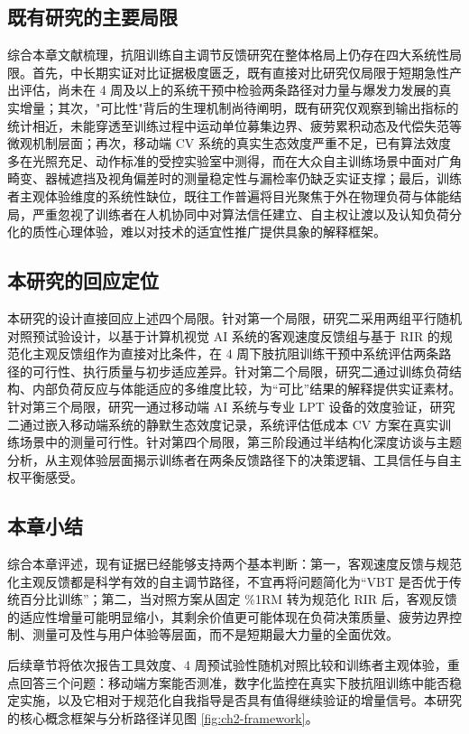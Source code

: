 \documentclass[UTF8,zihao=-4,twoside,openany]{ctexbook}
\begin{document}
\subsection{既有研究的主要局限}
综合本章文献梳理，抗阻训练自主调节反馈研究在整体格局上仍存在四大系统性局限。首先，中长期实证对比证据极度匮乏，既有直接对比研究仅局限于短期急性产出评估，尚未在 4 周及以上的系统干预中检验两条路径对力量与爆发力发展的真实增量；其次，"可比性"背后的生理机制尚待阐明，既有研究仅观察到输出指标的统计相近，未能穿透至训练过程中运动单位募集边界、疲劳累积动态及代偿失范等微观机制层面；再次，移动端 CV 系统的真实生态效度严重不足，已有算法效度多在光照充足、动作标准的受控实验室中测得，而在大众自主训练场景中面对广角畸变、器械遮挡及视角偏差时的测量稳定性与漏检率仍缺乏实证支撑；最后，训练者主观体验维度的系统性缺位，既往工作普遍将目光聚焦于外在物理负荷与体能结局，严重忽视了训练者在人机协同中对算法信任建立、自主权让渡以及认知负荷分化的质性心理体验，难以对技术的适宜性推广提供具象的解释框架。
\subsection{本研究的回应定位}
本研究的设计直接回应上述四个局限。针对第一个局限，研究二采用两组平行随机对照预试验设计，以基于计算机视觉 AI 系统的客观速度反馈组与基于 RIR 的规范化主观反馈组作为直接对比条件，在 4 周下肢抗阻训练干预中系统评估两条路径的可行性、执行质量与初步适应差异。针对第二个局限，研究二通过训练负荷结构、内部负荷反应与体能适应的多维度比较，为“可比”结果的解释提供实证素材。针对第三个局限，研究一通过移动端 AI 系统与专业 LPT 设备的效度验证，研究二通过嵌入移动端系统的静默生态效度记录，系统评估低成本 CV 方案在真实训练场景中的测量可行性。针对第四个局限，第三阶段通过半结构化深度访谈与主题分析，从主观体验层面揭示训练者在两条反馈路径下的决策逻辑、工具信任与自主权平衡感受。

\subsection{本章小结}
综合本章评述，现有证据已经能够支持两个基本判断：第一，客观速度反馈与规范化主观反馈都是科学有效的自主调节路径，不宜再将问题简化为“VBT 是否优于传统百分比训练”；第二，当对照方案从固定 \%1RM 转为规范化 RIR 后，客观反馈的适应性增量可能明显缩小，其剩余价值更可能体现在负荷决策质量、疲劳边界控制、测量可及性与用户体验等层面，而不是短期最大力量的全面优效。

后续章节将依次报告工具效度、4 周预试验性随机对照比较和训练者主观体验，重点回答三个问题：移动端方案能否测准，数字化监控在真实下肢抗阻训练中能否稳定实施，以及它相对于规范化自我指导是否具有值得继续验证的增量信号。本研究的核心概念框架与分析路径详见图 \ref{fig:ch2-framework}。
\end{document}
